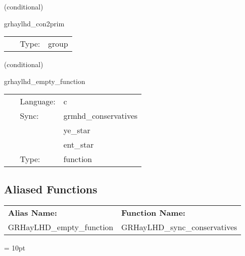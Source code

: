 \documentclass{article}
\begin{document}
\vspace{5mm}

   (conditional) 

\hspace{5mm} grhaylhd\_con2prim 

\hspace{5mm}{\it compute primitive variables from conservatives } 


\hspace{5mm}

 \begin{tabular*}{160mm}{cll} 
~ & Type:  & group \\ 
\end{tabular*} 


\vspace{5mm}

   (conditional) 

\hspace{5mm} grhaylhd\_empty\_function 

\hspace{5mm}{\it sync conservative variable ghost zones for c2p routine } 


\hspace{5mm}

 \begin{tabular*}{160mm}{cll} 
~ & Language:  & c \\ 
~ & Sync:  & grmhd\_conservatives \\ 
~& ~ &ye\_star\\ 
~& ~ &ent\_star\\ 
~ & Type:  & function \\ 
\end{tabular*} 


\subsection*{Aliased Functions}

\hspace{5mm}

 \begin{tabular*}{160mm}{ll} 

{\bf Alias Name:} ~~~~~~~ & {\bf Function Name:} \\ 
GRHayLHD\_empty\_function & GRHayLHD\_sync\_conservatives \\ 
\end{tabular*} 



\vspace{5mm}\parskip = 10pt 
\end{document}
